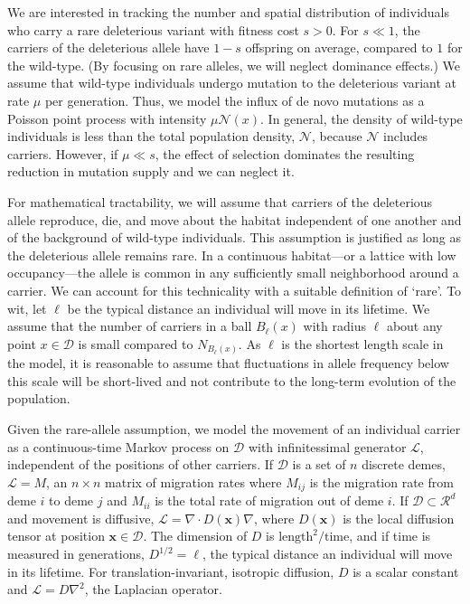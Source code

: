 \documentclass{article}
\begin{document}
We are interested in tracking the number and spatial distribution of individuals who carry a rare deleterious variant with fitness cost $s>0$.
For $s \ll 1$, the carriers of the deleterious allele have $1-s$ offspring on average, compared to $1$ for the wild-type. (By focusing on rare alleles, we will neglect dominance effects.)
We assume that wild-type individuals undergo mutation to the deleterious variant at rate $\mu$ per generation.
Thus, we model the influx of de novo mutations as a Poisson point process with intensity $\mu \mathcal{N}(x)$.
In general, the density of wild-type individuals is less than the total population density, $\mathcal{N}$, because $\mathcal{N}$ includes carriers.
However, if $\mu \ll s$, the effect of selection dominates the resulting reduction in mutation supply and we can neglect it.

For mathematical tractability, we will assume that carriers of the deleterious allele reproduce, die, and move about the habitat independent of one another and of the background of wild-type individuals.
This assumption is justified as long as the deleterious allele remains rare.
In a continuous habitat---or a lattice with low occupancy---the allele is common in any sufficiently small neighborhood around a carrier.
We can account for this technicality with a suitable definition of `rare'.
To wit, let $\ell$ be the typical distance an individual will move in its lifetime.
We assume that the number of carriers in a ball $B_\ell(x)$ with radius $\ell$ about any point $x \in \mathcal{D}$ is small compared to $N_{B_\ell(x)}$.
As $\ell$ is the shortest length scale in the model, it is reasonable to assume that fluctuations in allele frequency below this scale will be short-lived and not contribute to the long-term evolution of the population.

Given the rare-allele assumption, we model the movement of an individual carrier as a continuous-time Markov process on $\mathcal{D}$ with infinitessimal generator $\mathcal{L}$, independent of the positions of other carriers.
If $\mathcal{D}$ is a set of $n$ discrete demes, $\mathcal{L} = M$, an $n \times n$ matrix of migration rates where $M_{ij}$ is the migration rate from deme $i$ to deme $j$ and $M_{ii}$ is the total rate of migration out of deme $i$.
If $\mathcal{D} \subset \mathcal{R}^d$ and movement is diffusive, $\mathcal{L} = \nabla \cdot D(\mathbf{x}) \nabla$, where $D(\mathbf{x})$ is the local diffusion tensor at position $\mathbf{x} \in \mathcal{D}$.
The dimension of $D$ is $\text{length}^2 / \text{time}$, and if time is measured in generations, $D^{1/2} = \ell$, the typical distance an individual will move in its lifetime.
For translation-invariant, isotropic diffusion, $D$ is a scalar constant and $\mathcal{L} = D\nabla^2$, the Laplacian operator.
\end{document}
